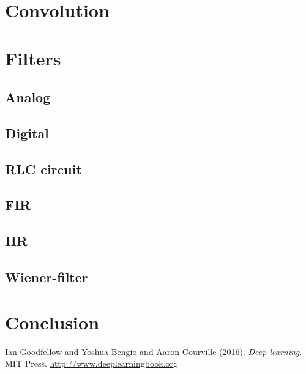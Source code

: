 \documentclass[12pt]{article}
\theoremstyle{plain}
\begin{document}
\section{Convolution}



\section{Filters}


\subsection{Analog}


\subsection{Digital}


\subsection{RLC circuit}


\subsection{FIR}


\subsection{IIR}


\subsection{Wiener-filter}



\section{Conclusion}

\begin{thebibliography}{Nature}
%

\hypertarget{Deeplea_Goodfellow}{}
Ian Goodfellow and Yoshua Bengio and Aaron Courville (2016). \textit{Deep learning}. MIT Press. \url{http://www.deeplearningbook.org}

\end{thebibliography}
\end{document}
